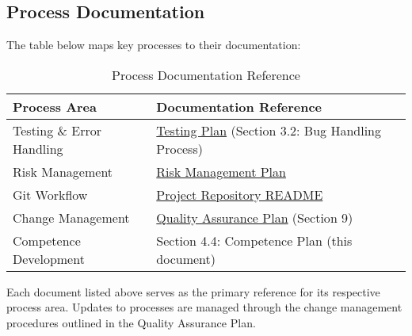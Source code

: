 \subsection*{Process Documentation}
The table below maps key processes to their documentation:

\begin{table}[h]
\begin{tabularx}{\textwidth}{>{\raggedright\arraybackslash}p{}>{\raggedright\arraybackslash}X}
\toprule
\textbf{Process Area} & \textbf{Documentation Reference} \\
\midrule
Testing \& Error Handling & \href{https://gitlab.liu.se/tddc88-ht24/company3/-/raw/Doc\_Version\_Control/Documentation/Testing\%20Plan/Testing\_Plan.pdf?ref\_type=heads\&inline=false}{Testing Plan} (Section 3.2: Bug Handling Process) \\
\addlinespace
Risk Management & \href{https://gitlab.liu.se/tddc88-ht24/company3/-/raw/Doc\_Version\_Control/Documentation/Risk\%20Management\%20Plan/Risk\_Management\_Plan.pdf?ref\_type=heads\&inline=false}{Risk Management Plan} \\
\addlinespace
Git Workflow & \href{https://gitlab.liu.se/tddc88-ht24/company3/-/blob/development/README.md?ref\_type=heads}{Project Repository README} \\
\addlinespace
Change Management & \href{https://gitlab.liu.se/tddc88-ht24/company3/-/raw/Doc\_Version\_Control/Documentation/Software\%20Quality\%20Assurance/Quality\_Assurance\_Plan.pdf?ref\_type=heads\&inline=false}{Quality Assurance Plan} (Section 9) \\
\addlinespace
Competence Development & Section 4.4: Competence Plan (this document) \\
\bottomrule
\end{tabularx}
\caption{Process Documentation Reference}
\label{tab:process-docs}
\end{table}

Each document listed above serves as the primary reference for its respective process area. Updates to processes are managed through the change management procedures outlined in the Quality Assurance Plan.